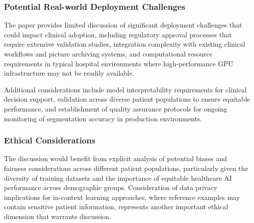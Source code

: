 \subsubsection{Potential Real-world Deployment Challenges}
The paper provides limited discussion of significant deployment challenges that could impact clinical adoption, including regulatory approval processes that require extensive validation studies, integration complexity with existing clinical workflows and picture archiving systems, and computational resource requirements in typical hospital environments where high-performance GPU infrastructure may not be readily available.

Additional considerations include model interpretability requirements for clinical decision support, validation across diverse patient populations to ensure equitable performance, and establishment of quality assurance protocols for ongoing monitoring of segmentation accuracy in production environments.

\subsubsection{Ethical Considerations}
The discussion would benefit from explicit analysis of potential biases and fairness considerations across different patient populations, particularly given the diversity of training datasets and the importance of equitable healthcare AI performance across demographic groups. Consideration of data privacy implications for in-context learning approaches, where reference examples may contain sensitive patient information, represents another important ethical dimension that warrants discussion.

